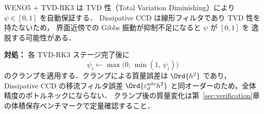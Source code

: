 \begin{tcolorbox}[warnbox, title={TVD 性の欠如と ψ のクランプ処置}]
\label{warn:adv_clamp}

WENO5 + TVD-RK3 は TVD 性（Total Variation Diminishing）により
$\psi \in [0,1]$ を自動保証する．
Dissipative CCD は線形フィルタであり TVD 性を持たないため，
界面近傍での Gibbs 振動が抑制不足になると $\psi$ が $[0,1]$ を
逸脱する可能性がある．

\textbf{対処：} 各 TVD-RK3 ステージ完了後に
\begin{equation}
  \psi_i \leftarrow \max\bigl(0,\, \min(1,\, \psi_i)\bigr)
  \label{eq:psi_clamp}
\end{equation}
のクランプを適用する．クランプによる質量誤差は $\Ord{h^2}$ であり，
Dissipative CCD の移流フィルタ誤差 $\Ord{\varepsilon_d^{\mathrm{adv}} h^2}$
と同オーダーのため，全体精度のボトルネックにならない．
クランプ後の質量変化は第~\ref{sec:verification}章の体積保存ベンチマークで定量確認すること．
\end{tcolorbox}

